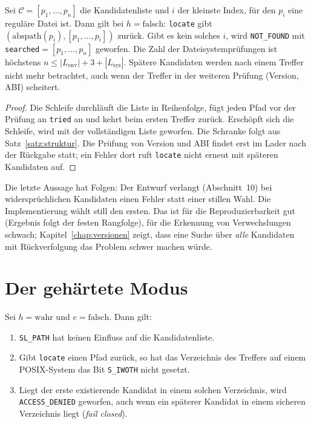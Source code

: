 \begin{satz}
	\label{satz:auswahl}
	Sei $\mathcal{C}=[p_1,\ldots,p_n]$ die Kandidatenliste und $i$ der kleinste Index, für den $p_i$ eine reguläre Datei ist. Dann gilt bei $h=\mathrm{falsch}$: \texttt{locate} gibt $(\mathrm{abspath}(p_i),[p_1,\ldots,p_i])$ zurück. Gibt es kein solches $i$, wird \texttt{NOT\_FOUND} mit \texttt{searched}$=[p_1,\ldots,p_n]$ geworfen. Die Zahl der Dateisystemprüfungen ist höchstens $n\le |L_{\mathrm{env}}|+3+|L_{\mathrm{sys}}|$. Spätere Kandidaten werden nach einem Treffer nicht mehr betrachtet, auch wenn der Treffer in der weiteren Prüfung (Version, ABI) scheitert.
\end{satz}

\begin{proof}
	Die Schleife durchläuft die Liste in Reihenfolge, fügt jeden Pfad vor der Prüfung an \texttt{tried} an und kehrt beim ersten Treffer zurück. Erschöpft sich die Schleife, wird mit der vollständigen Liste geworfen. Die Schranke folgt aus Satz~\ref{satz:struktur}. Die Prüfung von Version und ABI findet erst im Lader nach der Rückgabe statt; ein Fehler dort ruft \texttt{locate} nicht erneut mit späteren Kandidaten auf.
\end{proof}

Die letzte Aussage hat Folgen: Der Entwurf verlangt (Abschnitt~10) bei widersprüchlichen Kandidaten einen Fehler statt einer stillen Wahl. Die Implementierung wählt still den ersten. Das ist für die Reproduzierbarkeit gut (Ergebnis folgt der festen Rangfolge), für die Erkennung von Verwechslungen schwach; Kapitel~\ref{chap:versionen} zeigt, dass eine Suche über \emph{alle} Kandidaten mit Rückverfolgung das Problem schwer machen würde.

\section{Der gehärtete Modus}

\begin{satz}
	\label{satz:gehaertet}
	Sei $h=\mathrm{wahr}$ und $e=\mathrm{falsch}$. Dann gilt:
	\begin{enumerate}[label=(\roman*)]
		\item \texttt{SL\_PATH} hat keinen Einfluss auf die Kandidatenliste.
		\item Gibt \texttt{locate} einen Pfad zurück, so hat das Verzeichnis des Treffers auf einem POSIX-System das Bit \texttt{S\_IWOTH} nicht gesetzt.
		\item Liegt der erste existierende Kandidat in einem solchen Verzeichnis, wird \texttt{ACCESS\_DENIED} geworfen, auch wenn ein späterer Kandidat in einem sicheren Verzeichnis liegt (\emph{fail closed}).
	\end{enumerate}
\end{satz}

